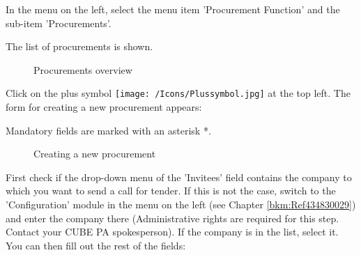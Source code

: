 In the menu on the left, select the menu item 'Procurement Function' and the sub-item 'Procurements'. 

\vspace{5cm}

The list of procurements is shown.

\vspace{2cm}

\begin{figure}[H]
\caption{Procurements overview}
\end{figure}


Click on the plus symbol \texttt{[image: /Icons/Plussymbol.jpg]}  at the top left. The form for creating a new procurement appears:

\vspace{\baselineskip}

Mandatory fields are marked with an asterisk *.

\begin{figure}[H]
\caption{Creating a new procurement}
\end{figure}

First check if the drop-down menu of the 'Invitees' field  contains the company to which you want to send a call for tender. If this is not the case, switch to the 'Configuration' module in the menu on the left (see Chapter \ref{bkm:Ref434830029}) and enter the company there (Administrative rights are required for this step. Contact your CUBE PA spokesperson). If the company is in the list, select it. You can then fill out the rest of the fields:

\vspace{\baselineskip}

